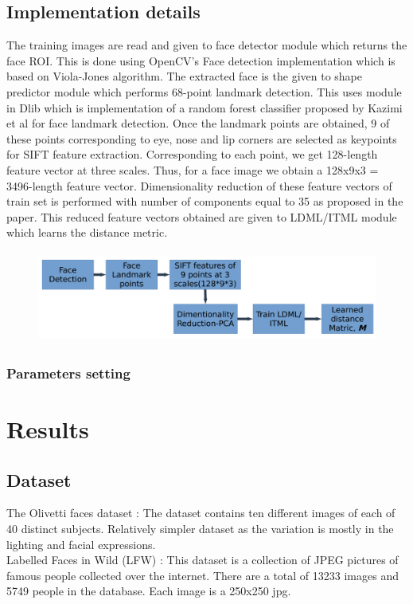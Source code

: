 \documentclass{article}
\begin{document}
\subsection{Implementation details}\label{sec:ldml_impl}
The training images are read and given to face detector module which returns the face ROI. This is done using OpenCV's Face detection implementation which is based on Viola-Jones algorithm. The extracted face is the given to shape predictor module which performs 68-point landmark detection. This uses module in Dlib which is implementation of a random forest classifier proposed by Kazimi et al for face landmark detection.
Once the landmark points are obtained, 9 of these points corresponding to eye, nose and lip corners are selected as keypoints for SIFT feature extraction. Corresponding to each point, we get 128-length feature vector at three scales. Thus, for a face image we obtain a 128x9x3 = 3496-length feature vector.
Dimensionality reduction of these feature vectors of train set is performed with number of components equal to 35 as proposed in the paper.
This reduced feature vectors obtained are given to LDML/ITML module which learns the distance metric.
\begin{figure}[H]
    \centering
    \includegraphics[height=3cm]{./ldml_img1.png}
\end{figure}

\subsubsection{Parameters setting}

\section{Results}\label{sec:results}

\subsection{Dataset}

The Olivetti faces dataset : The dataset contains ten different images of each of 40 distinct subjects. Relatively simpler dataset as the variation is mostly in the lighting and facial expressions.\\
[0.5cm]
Labelled Faces in Wild (LFW) : This dataset is a collection of JPEG pictures of famous people collected over the internet. There are a total of 13233 images and 5749 people in the database.
Each image is a 250x250 jpg. 
\end{document}
